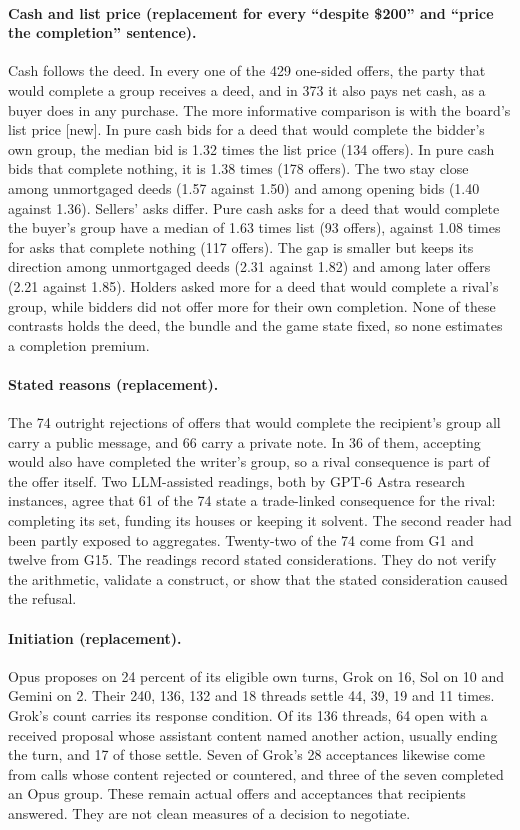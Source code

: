 \paragraph{Cash and list price (replacement for every ``despite \$200'' and ``price the completion'' sentence).} Cash follows the deed. In every one of the 429 one-sided offers, the party that would complete a group receives a deed, and in 373 it also pays net cash, as a buyer does in any purchase. The more informative comparison is with the board's list price [new]. In pure cash bids for a deed that would complete the bidder's own group, the median bid is 1.32 times the list price (134 offers). In pure cash bids that complete nothing, it is 1.38 times (178 offers). The two stay close among unmortgaged deeds (1.57 against 1.50) and among opening bids (1.40 against 1.36). Sellers' asks differ. Pure cash asks for a deed that would complete the buyer's group have a median of 1.63 times list (93 offers), against 1.08 times for asks that complete nothing (117 offers). The gap is smaller but keeps its direction among unmortgaged deeds (2.31 against 1.82) and among later offers (2.21 against 1.85). Holders asked more for a deed that would complete a rival's group, while bidders did not offer more for their own completion. None of these contrasts holds the deed, the bundle and the game state fixed, so none estimates a completion premium.

\paragraph{Stated reasons (replacement).} The 74 outright rejections of offers that would complete the recipient's group all carry a public message, and 66 carry a private note. In 36 of them, accepting would also have completed the writer's group, so a rival consequence is part of the offer itself. Two LLM-assisted readings, both by GPT-6 Astra research instances, agree that 61 of the 74 state a trade-linked consequence for the rival: completing its set, funding its houses or keeping it solvent. The second reader had been partly exposed to aggregates. Twenty-two of the 74 come from G1 and twelve from G15. The readings record stated considerations. They do not verify the arithmetic, validate a construct, or show that the stated consideration caused the refusal.

\paragraph{Initiation (replacement).} Opus proposes on 24 percent of its eligible own turns, Grok on 16, Sol on 10 and Gemini on 2. Their 240, 136, 132 and 18 threads settle 44, 39, 19 and 11 times. Grok's count carries its response condition. Of its 136 threads, 64 open with a received proposal whose assistant content named another action, usually ending the turn, and 17 of those settle. Seven of Grok's 28 acceptances likewise come from calls whose content rejected or countered, and three of the seven completed an Opus group. These remain actual offers and acceptances that recipients answered. They are not clean measures of a decision to negotiate.

